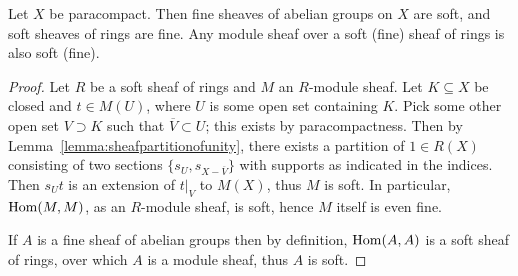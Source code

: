 \documentclass[a4paper,openany]{scrbook}
\begin{document}
\begin{prop}\label{prop:finesoftsheaves}
Let $X$ be paracompact. Then fine sheaves of abelian groups on $X$ are soft, and soft sheaves of rings are fine. Any module sheaf over a soft (fine) sheaf of rings is also soft (fine).
\end{prop}
\begin{proof}
Let $R$ be a soft sheaf of rings and $M$ an $R$-module sheaf. Let $K \subseteq X$ be closed and $t \in M(U)$, where $U$ is some open set containing $K$. Pick some other open set $V \supset K$ such that $\overline V \subset U$; this exists by paracompactness. Then by Lemma~\ref{lemma:sheafpartitionofunity}, there exists a partition of $1 \in R(X)$ consisting of two sections $\{s_U,s_{X-\overline V}\}$ with supports as indicated in the indices. Then $s_U t$ is an extension of $t|_V$ to $M(X)$, thus $M$ is soft. In particular, $\operatorname{Hom}(M,M)$, as an $R$-module sheaf, is soft, hence $M$ itself is even fine.

If $A$ is a fine sheaf of abelian groups then by definition, $\operatorname{Hom}(A,A)$ is a soft sheaf of rings, over which $A$ is a module sheaf, thus $A$ is soft.
\end{proof}
\end{document}
